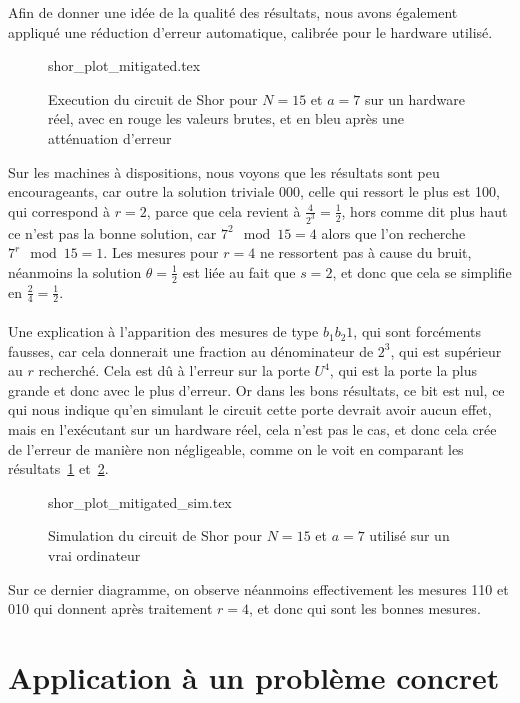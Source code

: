 Afin de donner une idée de la qualité des résultats, nous avons également appliqué une
réduction d'erreur automatique, calibrée pour le hardware utilisé.
\begin{figure}[H]
    \centering
    {shor_plot_mitigated.tex}
    \caption{Execution du circuit de Shor pour $N=15$ et $a=7$ sur un hardware réel, avec en rouge les valeurs brutes, et en bleu après une atténuation d'erreur \protect\footnotemark}
    \label{fig:shor-15-7-re}
\end{figure}
Sur les machines à dispositions, nous voyons que les résultats sont peu encourageants, car outre la solution
triviale 000, celle qui ressort le plus est 100, qui correspond à $r=2$, parce que cela revient à $\frac{4}{2^3} = \frac{1}{2}$, hors comme dit plus haut ce n'est pas
la bonne solution, car $7^2 \mod 15 = 4 $ alors que l'on recherche $7^r \mod 15 = 1$.
Les mesures pour $r=4$ ne ressortent pas à cause du bruit, néanmoins la solution $\theta = \frac{1}{2}$ est
liée au fait que $s=2$, et donc que cela se simplifie en $\frac{2}{4} = \frac{1}{2}$.\\ \\
Une explication à l'apparition des mesures de type $b_1 b_2 1$, qui sont forcéments fausses, car cela donnerait
une fraction au dénominateur de $2^3$, qui est supérieur au $r$ recherché.
Cela est dû à l'erreur sur la porte $U^4$, qui est la porte la plus grande et donc avec le plus d'erreur.
Or dans les bons résultats, ce bit est nul, ce qui nous indique qu'en simulant le circuit cette porte devrait
avoir aucun effet, mais en l'exécutant sur un hardware réel, cela n'est pas le cas, et donc cela crée de l'erreur
de manière non négligeable, comme on le voit en comparant les résultats~\ref{fig:shor-15-7-re} et~\ref{fig:shor-15-7-re-sim}.
\begin{figure}[H]
    \centering
    {shor_plot_mitigated_sim.tex}
    \caption{Simulation du circuit de Shor pour $N=15$ et $a=7$ utilisé sur un vrai ordinateur}
    \label{fig:shor-15-7-re-sim}
\end{figure}
Sur ce dernier diagramme, on observe néanmoins effectivement les mesures 110 et 010 qui donnent après traitement $r=4$,
et donc qui sont les bonnes mesures.

\section{Application à un problème concret}\label{sec:application-a-un-probleme-concret}

